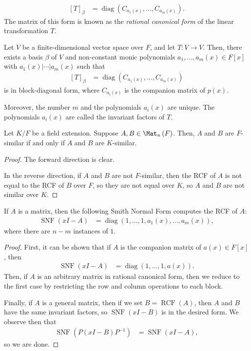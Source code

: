 \documentclass[10pt]{mypackage}
\begin{document}
\begin{align*}
  \left[ T \right]_{\beta} &= \operatorname{diag}\left( C_{a_1(x)},\dots,C_{a_m(x)} \right).
\end{align*}
The matrix of this form is known as the \textit{rational canonical form} of the linear transformation $T$.
\begin{theorem}
  Let $V$ be a finite-dimensional vector space over $F$, and let $T\colon V\rightarrow V$. Then, there exists a basis $\beta$ of $V$ and non-constant monic polynomials $a_1,\dots,a_m(x)\in F[x]$ with $a_1(x) | \cdots | a_m(x)$ such that
  \begin{align*}
    \left[ T \right]_{\beta} &= \operatorname{diag}\left( C_{a_1(x)},\dots,C_{a_m(x)} \right)
  \end{align*}
  is in block-diagonal form, where $C_{a_i(x)}$ is the companion matrix of $p(x)$.

  Moreover, the number $m$ and the polynomials $a_i(x)$ are unique. The polynomials $a_i(x)$ are called the invariant factors of $T$.
\end{theorem}
\begin{corollary}
  Let $K/F$ be a field extension. Suppose $A,B\in \Mat_n\left( F \right)$. Then, $A$ and $B$ are $F$-similar if and only if $A$ and $B$ are $K$-similar.
\end{corollary}
\begin{proof}
  The forward direction is clear.

  In the reverse direction, if $A$ and $B$ are not $F$-similar, then the RCF of $A$ is not equal to the RCF of $B$ over $F$, so they are not equal over $K$, so $A$ and $B$ are not similar over $K$.
\end{proof}
\begin{theorem}
  If $A$ is a matrix, then the following Smith Normal Form computes the RCF of $A$:
  \begin{align*}
    \operatorname{SNF}\left( xI-A \right) &= \operatorname{diag}\left( 1,\dots,1,a_1(x),\dots,a_m(x) \right),
  \end{align*}
  where there are $n-m$ instances of $1$.
\end{theorem}
\begin{proof}
  First, it can be shown that if $A$ is the companion matrix of $a(x)\in F[x]$, then 
  \begin{align*}
    \operatorname{SNF}\left( xI - A \right) &= \operatorname{diag}\left( 1,\dots,1,a(x) \right).
  \end{align*}
  Then, if $A$ is an arbitrary matrix in rational canonical form, then we reduce to the first case by restricting the row and column operations to each block.

  Finally, if $A$ is a general matrix, then if we set $B = \operatorname{RCF}\left( A \right)$, then $A$ and $B$ have the same invariant factors, so $\operatorname{SNF}\left( xI - B \right)$ is in the desired form. We observe then that
  \begin{align*}
    \operatorname{SNF}\left( P\left( xI- B \right)P^{-1} \right) &= \operatorname{SNF}\left( xI - A \right),
  \end{align*}
  so we are done.
\end{proof}
\end{document}
